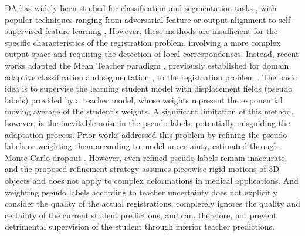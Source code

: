 \documentclass[runningheads]{llncs}
\begin{document}
DA has widely been studied for classification and segmentation tasks \cite{guan2021domain}, with popular techniques ranging from adversarial feature \cite{ganin2015unsupervised,tzeng2017adversarial} or output \cite{tsai2018learning} alignment to self-supervised feature learning \cite{sun2019unsupervised}.
However, these methods are insufficient for the specific characteristics of the registration problem, involving a more complex output space and requiring the detection of local correspondences.
Instead, recent works adapted the Mean Teacher paradigm \cite{tarvainen2017mean}, previously established for domain adaptive classification \cite{french2018selfensembling} and segmentation \cite{perone2019unsupervised}, to the registration problem \cite{bigalke2022adapting,jin2022deformation,xu2022double}.
The basic idea is to supervise the learning student model with displacement fields (pseudo labels) provided by a teacher model, whose weights represent the exponential moving average of the student's weights.
A significant limitation of this method, however, is the inevitable noise in the pseudo labels, potentially misguiding the adaptation process.
Prior works addressed this problem by refining the pseudo labels \cite{jin2022deformation} or weighting them according to model uncertainty, estimated through Monte Carlo dropout \cite{xu2022double,yu2019uncertainty}.
However, even refined pseudo labels remain inaccurate, and the proposed refinement strategy \cite{jin2022deformation} assumes piecewise rigid motions of 3D objects and does not apply to complex deformations in medical applications.
And weighting pseudo labels according to teacher uncertainty \cite{xu2022double,yu2019uncertainty} does not explicitly consider the quality of the actual registrations, completely ignores the quality and certainty of the current student predictions, and can, therefore, not prevent detrimental supervision of the student through inferior teacher predictions.
\end{document}
